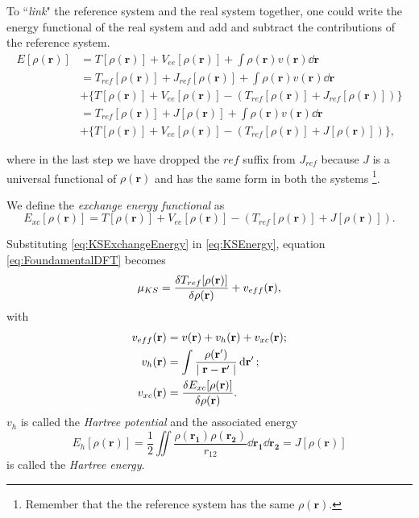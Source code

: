 \documentclass[a4paper,12pt]{article}
\newcommand\dens{\rho(\mathbf{r})}
\newcommand\erre{\mathbf{r}}
\begin{document}
To ``\textit{link}" the reference system and the real system together, one could write the energy functional of the real system and add and subtract the contributions of the reference system.
\begin{align}
	E[\dens] &= T[\dens] + V_{ee}[\dens] + \int \dens v(\erre) \dd{\erre} \\
			 &= T_{ref}[\dens] + J_{ref}[\dens] + \int \dens v(\erre) \dd{\erre} \nonumber \\ 
			 &+ \lbrace
			 	T[\dens] + V_{ee}[\dens] - 
			 	\left( 
			 		T_{ref}[\dens] + J_{ref}[\dens] 
			 	\right)
			 \rbrace \\
			 &= T_{ref}[\dens] + J[\dens] + \int \dens v(\erre) \dd{\erre} \nonumber \\ 
			 &+ \lbrace
			 	T[\dens] + V_{ee}[\dens] - 
			 	\left( 
			 		T_{ref}[\dens] + J[\dens] 
			 	\right)
			 \rbrace, \label{eq:KSEnergy}
\end{align}

where in the last step we have dropped the $ref$ suffix from $J_{ref}$ because $J$ is a universal functional of $\dens$ and has the same form in both the systems \footnote{Remember that the the reference system has the same $\dens$.}.

We define the \textit{exchange energy functional} as 
\begin{equation}\label{eq:KSExchangeEnergy}
E_{xc}[\dens] = T[\dens] + V_{ee}[\dens] - 
			 	\left( 
			 		T_{ref}[\dens] + J[\dens] 
			 	\right)
.
\end{equation}

Substituting \eqref{eq:KSExchangeEnergy} in \eqref{eq:KSEnergy}, equation \eqref{eq:FoundamentalDFT} becomes 
\begin{equation}\label{eq:KSChemPot} 
	\mu_{KS} = \frac{\var{T_{ref}[\dens]}}{\var{\dens}}  + v_{eff}(\erre),
\end{equation}
with 
\begin{align}
 v_{eff}(\erre) &= v(\erre)  + v_{h}(\erre)
 + v_{xc}(\erre) ;\\
 v_{h}(\erre) &= \int \frac{\rho(\mathbf{r'})}{\mid \mathbf{r} - \mathbf{r'} \mid}  \dd{\mathbf{r'}}; \label{eq:HartreePot}\\
 v_{xc}(\erre) &= \frac{\var{E_{xc}[\dens]}}{\var{\dens}} \label{eq:ExchangePotDer}.
\end{align}
$v_{h}$ is called the \textit{Hartree potential} and the associated energy 
\begin{equation}\label{eq:HartreeEnergy}
E_{h}[\dens] = \frac{1}{2} \iint \frac{\rho(\mathbf{r_{1}}) \rho(\mathbf{r_{2}}) }{r_{12}} \dd{\mathbf{r_1}} \dd{\mathbf{r_2}} = J[\dens]
\end{equation}
 is called the \textit{Hartree energy}.
\end{document}
